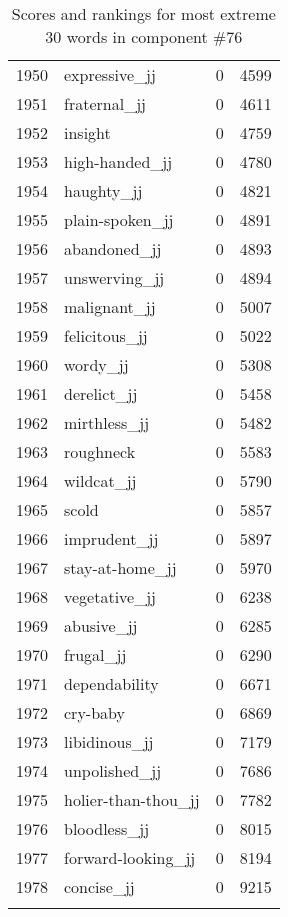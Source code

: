 \begin{longtable}[!htbp]{| rlr@{.}l |}
    1950 & expressive\_jj & 0 & 4599 \\
    1951 & fraternal\_jj & 0 & 4611 \\
    1952 & insight & 0 & 4759 \\
    1953 & high-handed\_jj & 0 & 4780 \\
    1954 & haughty\_jj & 0 & 4821 \\
    1955 & plain-spoken\_jj & 0 & 4891 \\
    1956 & abandoned\_jj & 0 & 4893 \\
    1957 & unswerving\_jj & 0 & 4894 \\
    1958 & malignant\_jj & 0 & 5007 \\
    1959 & felicitous\_jj & 0 & 5022 \\
    1960 & wordy\_jj & 0 & 5308 \\
    1961 & derelict\_jj & 0 & 5458 \\
    1962 & mirthless\_jj & 0 & 5482 \\
    1963 & roughneck & 0 & 5583 \\
    1964 & wildcat\_jj & 0 & 5790 \\
    1965 & scold & 0 & 5857 \\
    1966 & imprudent\_jj & 0 & 5897 \\
    1967 & stay-at-home\_jj & 0 & 5970 \\
    1968 & vegetative\_jj & 0 & 6238 \\
    1969 & abusive\_jj & 0 & 6285 \\
    1970 & frugal\_jj & 0 & 6290 \\
    1971 & dependability & 0 & 6671 \\
    1972 & cry-baby & 0 & 6869 \\
    1973 & libidinous\_jj & 0 & 7179 \\
    1974 & unpolished\_jj & 0 & 7686 \\
    1975 & holier-than-thou\_jj & 0 & 7782 \\
    1976 & bloodless\_jj & 0 & 8015 \\
    1977 & forward-looking\_jj & 0 & 8194 \\
    1978 & concise\_jj & 0 & 9215 \\
    \hline
    \caption{Scores and rankings for most extreme 30 words in component \#76} \\
\end{longtable}
